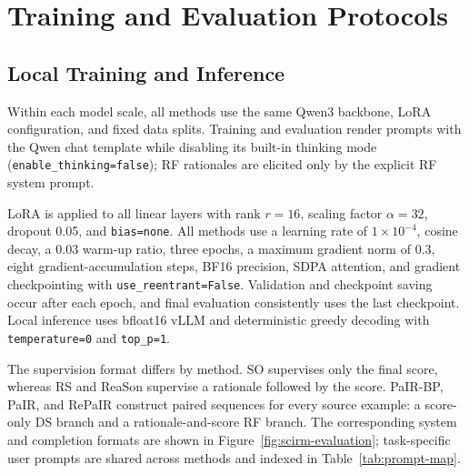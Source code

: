 \clearpage
\section{Training and Evaluation Protocols}
\label{app:experimental-details}
\label{app:external-llm}

\subsection{Local Training and Inference}

Within each model scale, all methods use the same Qwen3 backbone, LoRA
configuration, and fixed data splits. Training and evaluation
render prompts with the Qwen chat template while disabling its built-in
thinking mode (\texttt{enable\_thinking=false}); RF rationales are elicited
only by the explicit RF system prompt.

LoRA is applied to all linear layers with rank \(r=16\), scaling factor
\(\alpha=32\), dropout 0.05, and \texttt{bias=none}. All methods use a
learning rate of \(1\!\times\!10^{-4}\), cosine decay, a 0.03 warm-up ratio,
three epochs, a maximum gradient norm of 0.3, eight gradient-accumulation
steps, BF16 precision, SDPA attention, and gradient checkpointing with
\texttt{use\_reentrant=False}.
Validation and checkpoint saving occur after each epoch, and final evaluation
consistently uses the last checkpoint. Local inference
uses bfloat16 vLLM and deterministic
greedy decoding with \texttt{temperature=0} and \texttt{top\_p=1}.

The supervision format differs by method. SO supervises only the final score,
whereas RS and ReaSon supervise a rationale followed by the score. PaIR-BP,
PaIR, and RePaIR construct paired sequences for every source example: a
score-only DS branch and a rationale-and-score RF branch. The corresponding
system and completion formats are shown in Figure~\ref{fig:scirm-evaluation};
task-specific user prompts are shared across methods and indexed in
Table~\ref{tab:prompt-map}.

